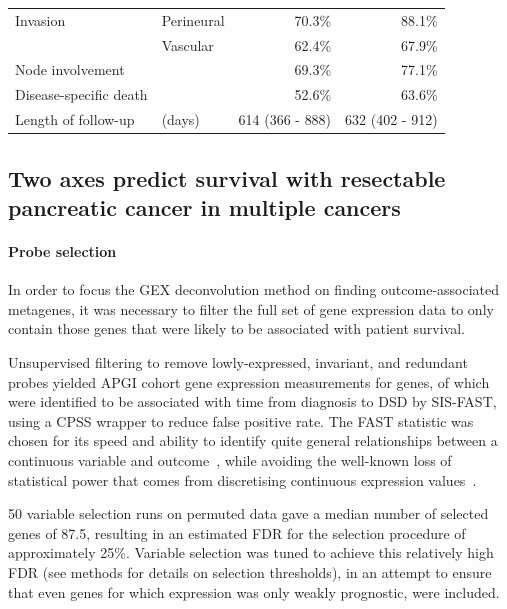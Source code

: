 \documentclass[dissertation.tex]{subfiles}
\begin{document}
\begin{table}[!htbp]
{\begin{tabular}{@{}llrr@{}}
Invasion                   & Perineural               & 70.3\%                   & 88.1\%                                                 \\
                           & Vascular                 & 62.4\%                   & 67.9\%                                                 \\
Node involvement           &                          & 69.3\%                   & 77.1\%                                                 \\
Disease-specific death     &                          & 52.6\%                   & 63.6\%                                                 \\
Length of follow-up & (days)                         & 614 (366 - 888)          & 632 (402 - 912)                                       
\end{tabular}
}
\end{table}

\subsection{Two axes predict survival with resectable pancreatic cancer in multiple cancers}
\paragraph{Probe selection}
In order to focus the \gls{GEX} deconvolution method on finding outcome-associated metagenes, it was necessary to filter the full set of gene expression data to only contain those genes that were likely to be associated with patient survival.

Unsupervised filtering to remove lowly-expressed, invariant, and redundant probes yielded \gls{APGI} cohort gene expression measurements for  genes, of which  were identified to be associated with time from diagnosis to \gls{DSD} by \gls{SIS}-\gls{FAST}, using a \gls{CPSS} wrapper to reduce false positive rate.  The \gls{FAST} statistic was chosen for its speed and ability to identify quite general relationships between a continuous variable and outcome~\cite{Gorst-Rasmussen2013}, while avoiding the well-known loss of statistical power that comes from discretising continuous expression values~\cite{Royston2006}.

50 variable selection runs on permuted data gave a median number of selected genes of 87.5, resulting in an estimated \gls{FDR} for the selection procedure of approximately 25\%.  Variable selection was tuned to achieve this relatively high \gls{FDR} (see methods for details on selection thresholds), in an attempt to ensure that even genes for which expression was only weakly prognostic, were included.
\end{document}
